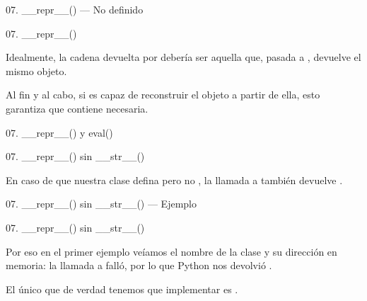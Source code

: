 \begin{frame}{07. \_\_repr\_\_() — No definido}
  \footnotesize
\end{frame}

\begin{frame}{07. \_\_repr\_\_()}
  \begin{alertblock}{}
    \centering
    Idealmente, la cadena devuelta por 
    debería ser aquella que, pasada a , devuelve el
    mismo objeto.
  \end{alertblock}

  \begin{center}
    \small
    Al fin y al cabo, si  es capaz de reconstruir el
    objeto a partir de ella, esto garantiza que contiene
     necesaria.
  \end{center}
\end{frame}

\begin{frame}{07. \_\_repr\_\_() y eval()}
  \scriptsize
\end{frame}

\begin{frame}{07. \_\_repr\_\_() sin  \_\_str\_\_()}
  \begin{block}{}
    \centering
    En caso de que nuestra clase defina 
    pero no , la llamada a 
    también devuelve .
  \end{block}
\end{frame}

\begin{frame}{07. \_\_repr\_\_() sin \_\_str\_\_() — Ejemplo}
  \footnotesize
\end{frame}

\begin{frame}{07. \_\_repr\_\_() sin  \_\_str\_\_()}
  \begin{block}{}
    \centering
    Por eso en el primer ejemplo veíamos el nombre de la clase y su
    dirección en memoria: la llamada a 
    falló, por lo que Python nos devolvió .
  \end{block}

  \begin{alertblock}{}
    \small
    \centering
    El único que de verdad tenemos que implementar es
    .
  \end{alertblock}
\end{frame}

